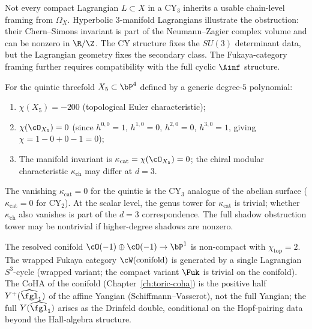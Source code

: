 \begin{remark}
\label{rem:cy3-framing-obstruction}
Not every compact Lagrangian $L \subset X$ in a CY$_3$ inherits a
usable chain-level framing from $\Omega_X$. Hyperbolic
$3$-manifold Lagrangians illustrate the obstruction: their
Chern--Simons invariant is part of the Neumann--Zagier complex
volume and can be nonzero in $\R/\Z$. The CY structure fixes the
$SU(3)$ determinant data, but the Lagrangian geometry fixes the
secondary class. The Fukaya-category framing further requires
compatibility with the full cyclic $\Ainf$ structure.
\end{remark}

\begin{example}
\label{ex:fukaya-quintic}
For the quintic threefold $X_5 \subset \bP^4$ defined by a
generic degree-$5$ polynomial:
\begin{enumerate}[label=(\roman*)]
 \item $\chi(X_5) = -200$ (topological Euler characteristic);
 \item $\chi(\cO_{X_5}) = 0$ (since $h^{0,0} = 1$,
 $h^{1,0} = 0$, $h^{2,0} = 0$, $h^{3,0} = 1$, giving
 $\chi = 1 - 0 + 0 - 1 = 0$);
 \item The manifold invariant is
 $\kappa_{\mathrm{cat}} = \chi(\cO_{X_5}) = 0$; the chiral
 modular characteristic $\kappa_{\mathrm{ch}}$ may differ at
 $d = 3$.
\end{enumerate}
The vanishing $\kappa_{\mathrm{cat}} = 0$ for the quintic is the
CY$_3$ analogue of the abelian surface ($\kappa_{\mathrm{cat}} = 0$
for CY$_2$). At the scalar level, the genus tower for
$\kappa_{\mathrm{cat}}$ is trivial; whether
$\kappa_{\mathrm{ch}}$ also vanishes is part of the $d = 3$
correspondence. The full shadow obstruction tower may be nontrivial
if higher-degree shadows are nonzero.
\end{example}

\begin{example}
\label{ex:fukaya-conifold}
The resolved conifold $\cO(-1) \oplus \cO(-1) \to \bP^1$ is
non-compact with $\chi_{\mathrm{top}} = 2$. The wrapped Fukaya
category $\cW(\text{conifold})$ is generated by a single Lagrangian
$S^3$-cycle (wrapped variant; the compact variant $\Fuk$ is
trivial on the conifold). The CoHA of the conifold
(Chapter~\ref{ch:toric-coha}) is the positive half
$Y^+(\widehat{\fgl}_1)$ of the affine Yangian
(Schiffmann--Vasserot), not the full Yangian; the full
$Y(\widehat{\fgl}_1)$ arises as the Drinfeld double, conditional
on the Hopf-pairing data beyond the Hall-algebra structure.
\end{example}

